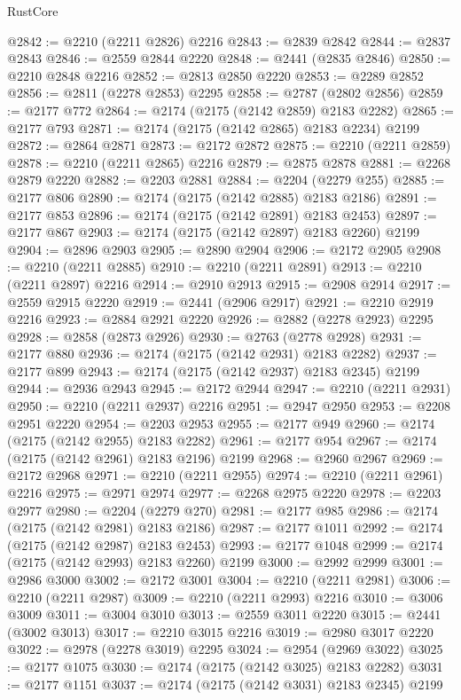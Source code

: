 \begin{lexlean}{RustCore}
\begin{coremodule}
@2842 := @2210 (@2211 @2826) @2216
@2843 := @2839 @2842
@2844 := @2837 @2843
@2846 := @2559 @2844 @2220
@2848 := @2441 (@2835 @2846)
@2850 := @2210 @2848 @2216
@2852 := @2813 @2850 @2220
@2853 := @2289 @2852
@2856 := @2811 (@2278 @2853) @2295
@2858 := @2787 (@2802 @2856)
@2859 := @2177 @772
@2864 := @2174 (@2175 (@2142 @2859) @2183 @2282)
@2865 := @2177 @793
@2871 := @2174 (@2175 (@2142 @2865) @2183 @2234) @2199
@2872 := @2864 @2871
@2873 := @2172 @2872
@2875 := @2210 (@2211 @2859)
@2878 := @2210 (@2211 @2865) @2216
@2879 := @2875 @2878
@2881 := @2268 @2879 @2220
@2882 := @2203 @2881
@2884 := @2204 (@2279 @255)
@2885 := @2177 @806
@2890 := @2174 (@2175 (@2142 @2885) @2183 @2186)
@2891 := @2177 @853
@2896 := @2174 (@2175 (@2142 @2891) @2183 @2453)
@2897 := @2177 @867
@2903 := @2174 (@2175 (@2142 @2897) @2183 @2260) @2199
@2904 := @2896 @2903
@2905 := @2890 @2904
@2906 := @2172 @2905
@2908 := @2210 (@2211 @2885)
@2910 := @2210 (@2211 @2891)
@2913 := @2210 (@2211 @2897) @2216
@2914 := @2910 @2913
@2915 := @2908 @2914
@2917 := @2559 @2915 @2220
@2919 := @2441 (@2906 @2917)
@2921 := @2210 @2919 @2216
@2923 := @2884 @2921 @2220
@2926 := @2882 (@2278 @2923) @2295
@2928 := @2858 (@2873 @2926)
@2930 := @2763 (@2778 @2928)
@2931 := @2177 @880
@2936 := @2174 (@2175 (@2142 @2931) @2183 @2282)
@2937 := @2177 @899
@2943 := @2174 (@2175 (@2142 @2937) @2183 @2345) @2199
@2944 := @2936 @2943
@2945 := @2172 @2944
@2947 := @2210 (@2211 @2931)
@2950 := @2210 (@2211 @2937) @2216
@2951 := @2947 @2950
@2953 := @2208 @2951 @2220
@2954 := @2203 @2953
@2955 := @2177 @949
@2960 := @2174 (@2175 (@2142 @2955) @2183 @2282)
@2961 := @2177 @954
@2967 := @2174 (@2175 (@2142 @2961) @2183 @2196) @2199
@2968 := @2960 @2967
@2969 := @2172 @2968
@2971 := @2210 (@2211 @2955)
@2974 := @2210 (@2211 @2961) @2216
@2975 := @2971 @2974
@2977 := @2268 @2975 @2220
@2978 := @2203 @2977
@2980 := @2204 (@2279 @270)
@2981 := @2177 @985
@2986 := @2174 (@2175 (@2142 @2981) @2183 @2186)
@2987 := @2177 @1011
@2992 := @2174 (@2175 (@2142 @2987) @2183 @2453)
@2993 := @2177 @1048
@2999 := @2174 (@2175 (@2142 @2993) @2183 @2260) @2199
@3000 := @2992 @2999
@3001 := @2986 @3000
@3002 := @2172 @3001
@3004 := @2210 (@2211 @2981)
@3006 := @2210 (@2211 @2987)
@3009 := @2210 (@2211 @2993) @2216
@3010 := @3006 @3009
@3011 := @3004 @3010
@3013 := @2559 @3011 @2220
@3015 := @2441 (@3002 @3013)
@3017 := @2210 @3015 @2216
@3019 := @2980 @3017 @2220
@3022 := @2978 (@2278 @3019) @2295
@3024 := @2954 (@2969 @3022)
@3025 := @2177 @1075
@3030 := @2174 (@2175 (@2142 @3025) @2183 @2282)
@3031 := @2177 @1151
@3037 := @2174 (@2175 (@2142 @3031) @2183 @2345) @2199

\end{coremodule}
\end{lexlean}
